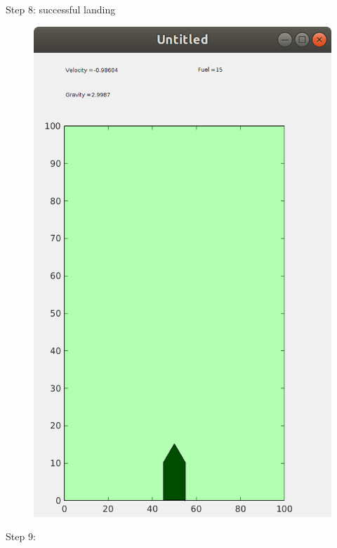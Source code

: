 \documentclass[11pt]{article}
\begin{document}
Step 8: successful landing
\begin{figure}[H]
            \centering
            \includegraphics[width=15cm]{winning landing.png}
\end{figure}
Step 9: 

\end{document}
